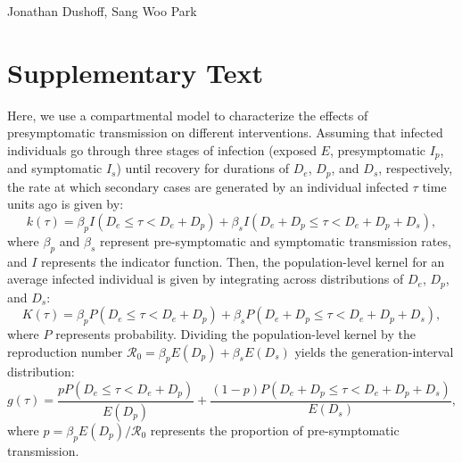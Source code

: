 \documentclass[12pt]{article}
\date{\today}
\newcommand{\Rx}[1]{\ensuremath{{\mathcal R}_{#1}}}
\newcommand{\Ro}{\Rx{0}}
\begin{document}
\begin{flushleft}
	{\Large \textbf{}}
	\newline
	Jonathan Dushoff,
	Sang Woo Park
\end{flushleft}

\section{Supplementary Text}

Here, we use a compartmental model to characterize the effects of presymptomatic transmission on different interventions.
Assuming that infected individuals go through three stages of infection (exposed $E$, presymptomatic $I_p$, and symptomatic $I_s$) until recovery for durations of $D_e$, $D_p$, and $D_s$, respectively, the rate at which secondary cases are generated by an individual infected $\tau$ time units ago is given by:
\begin{equation}
k(\tau) = \beta_p I(D_e \leq \tau < D_e + D_p) + \beta_s I(D_e + D_p \leq \tau < D_e + D_p + D_s),
\end{equation}
where $\beta_p$ and $\beta_s$ represent pre-symptomatic and symptomatic transmission rates, and $I$ represents the indicator function.
Then, the population-level kernel for an average infected individual is given by integrating across distributions of $D_e$, $D_p$, and $D_s$:
\begin{equation}
K(\tau) = \beta_p P(D_e \leq \tau < D_e + D_p) + \beta_s P(D_e + D_p \leq \tau < D_e + D_p + D_s),
\end{equation}
where $P$ represents probability.
Dividing the population-level kernel by the reproduction number $\Ro = \beta_p E(D_p) + \beta_s E(D_s)$ yields the generation-interval distribution:
\begin{equation}
g(\tau) = \frac{p P(D_e \leq \tau < D_e + D_p)}{E(D_p)} + \frac{(1-p) P(D_e + D_p \leq \tau < D_e + D_p + D_s)}{E(D_s)},
\end{equation}
where $p = \beta_p E(D_p)/\Ro$ represents the proportion of pre-symptomatic transmission.
 
\end{document}
